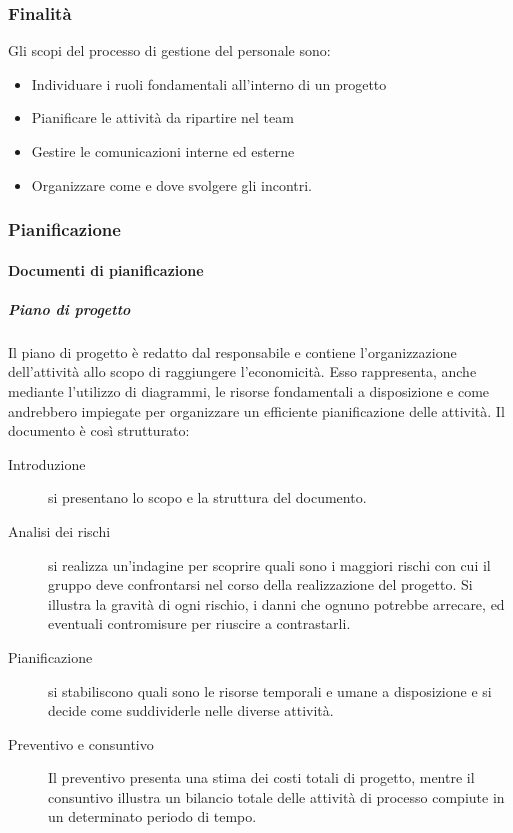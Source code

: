 \documentclass[../norme-di-progetto.tex]{subfiles}
\begin{document}
\subsubsection{Finalità}%
\label{subs:gestione_del_personale/finalita}

Gli scopi del processo di gestione del personale sono:

\begin{itemize}
  \item Individuare i ruoli fondamentali all'interno di un progetto
  \item Pianificare le attività da ripartire nel team
  \item Gestire le comunicazioni interne ed esterne
  \item Organizzare come e dove svolgere gli incontri.
\end{itemize}

\subsubsection{Pianificazione}%
\label{subs:pianificazione}

\paragraph{Documenti di pianificazione}%
\label{par:documenti_di_pianificazione}

\subparagraph{Piano di progetto}%
\label{subp:piano_di_progetto}
Il piano di progetto è redatto dal responsabile e contiene l'organizzazione dell'attività allo scopo di raggiungere l'economicità. Esso rappresenta, anche mediante l'utilizzo di diagrammi, le risorse fondamentali a disposizione e come andrebbero impiegate per organizzare un efficiente pianificazione delle attività. Il documento è così strutturato:
\begin{description}
  \item [Introduzione] si presentano lo scopo e la struttura del documento.
  \item [Analisi dei rischi] si realizza un'indagine per scoprire quali sono i maggiori rischi con cui il gruppo deve confrontarsi nel corso della realizzazione del progetto. Si illustra la gravità di ogni rischio, i danni che ognuno potrebbe arrecare, ed eventuali contromisure per riuscire a contrastarli.
  \item [Pianificazione] si stabiliscono quali sono le risorse temporali e umane a disposizione e si decide come suddividerle nelle diverse attività.
  \item [Preventivo e consuntivo] Il preventivo presenta una stima dei costi totali di progetto, mentre il consuntivo illustra un bilancio totale delle attività di processo compiute in un determinato periodo di tempo.
\end{description}
\end{document}
